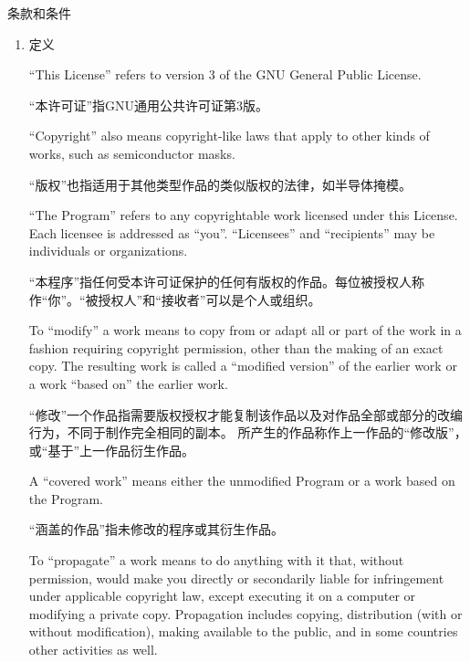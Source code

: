 \documentclass[11pt]{article}
\begin{document}
\begin{center}
  {\Large 条款和条件}
\end{center}


\begin{enumerate}

  \addtocounter{enumi}{-1}

  \item 定义

        ``This License'' refers to version 3 of the GNU General Public License.

        “本许可证”指GNU通用公共许可证第3版。

        ``Copyright'' also means copyright-like laws that apply to other kinds of
        works, such as semiconductor masks.

        “版权”也指适用于其他类型作品的类似版权的法律，如半导体掩模。

        ``The Program'' refers to any copyrightable work licensed under this
        License.  Each licensee is addressed as ``you''.  ``Licensees'' and
        ``recipients'' may be individuals or organizations.

        “本程序”指任何受本许可证保护的任何有版权的作品。每位被授权人称作“你”。“被授权人”和“接收者”可以是个人或组织。

        To ``modify'' a work means to copy from or adapt all or part of the work
        in a fashion requiring copyright permission, other than the making of an
        exact copy.  The resulting work is called a ``modified version'' of the
        earlier work or a work ``based on'' the earlier work.

        “修改”一个作品指需要版权授权才能复制该作品以及对作品全部或部分的改编行为，不同于制作完全相同的副本。
        所产生的作品称作上一作品的“修改版”，或“基于”上一作品衍生作品。

        A ``covered work'' means either the unmodified Program or a work based
        on the Program.

        “涵盖的作品”指未修改的程序或其衍生作品。

        To ``propagate'' a work means to do anything with it that, without
        permission, would make you directly or secondarily liable for
        infringement under applicable copyright law, except executing it on a
        computer or modifying a private copy.  Propagation includes copying,
        distribution (with or without modification), making available to the
        public, and in some countries other activities as well.


\end{enumerate}
\end{document}
